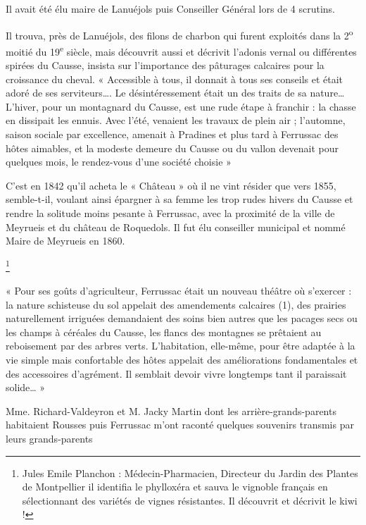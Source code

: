 Il avait été élu maire de Lanuéjols puis Conseiller Général lors de 4 scrutins.

Il trouva, près de Lanuéjols, des filons de charbon qui furent exploités dans la 2\textsuperscript{o} moitié du 19\textsuperscript{e} siècle,
mais découvrit aussi et décrivit l’adonis vernal ou différentes spirées du Causse, insista sur
l’importance des pâturages calcaires pour la croissance du cheval.
« Accessible à tous, il donnait à tous ses conseils et était adoré de ses serviteurs…. Le
désintéressement était un des traits de sa nature… L’hiver, pour un montagnard du Causse, est une
rude étape à franchir : la chasse en dissipait les ennuis. Avec l’été, venaient les travaux de plein air ;
l’automne, saison sociale par excellence, amenait à Pradines et plus tard à Ferrussac des hôtes
aimables, et la modeste demeure du Causse ou du vallon devenait pour quelques mois, le rendez-vous
d’une société choisie »

C’est en 1842 qu’il acheta le « Château » où il ne vint résider que vers 1855, semble-t-il, voulant ainsi
épargner à sa femme les trop rudes hivers du Causse et rendre la solitude moins pesante à Ferrussac,
avec la proximité de la ville de Meyrueis et du château de Roquedols.
Il fut élu conseiller municipal et nommé Maire de Meyrueis en 1860.

\footnote{Jules Emile Planchon : Médecin-Pharmacien, Directeur du Jardin des Plantes de Montpellier il identifia le
phylloxéra et sauva le vignoble français en sélectionnant des variétés de vignes résistantes. Il découvrit et
décrivit le kiwi !}


« Pour ses goûts d’agriculteur, Ferrussac était un nouveau théâtre où s’exercer : la nature
schisteuse du sol appelait des amendements calcaires (1), des prairies naturellement irriguées
demandaient des soins bien autres que les pacages secs ou les champs à céréales du Causse,
les flancs des montagnes se prêtaient au reboisement par des arbres verts.
L’habitation, elle-même, pour être adaptée à la vie simple mais confortable des hôtes appelait
des améliorations fondamentales et des accessoires d’agrément. Il semblait devoir vivre
longtemps tant il paraissait solide… »

Mme. Richard-Valdeyron et M. Jacky Martin dont les arrière-grands-parents habitaient Rousses puis Ferrussac
m’ont raconté quelques souvenirs transmis par leurs grands-parents

